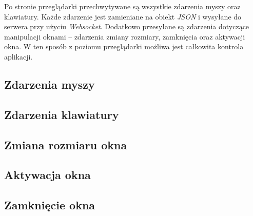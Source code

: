 Po stronie przeglądarki przechwytywane są wszystkie zdarzenia myszy oraz klawiatury. Każde zdarzenie jest zamieniane na obiekt \emph{JSON} i wysyłane do serwera przy użyciu \emph{Websocket}. Dodatkowo przesyłane są zdarzenia dotyczące manipulacji oknami -- zdarzenia zmiany rozmiary, zamknięcia oraz aktywacji okna. W ten sposób z poziomu przeglądarki możliwa jest całkowita kontrola aplikacji.

\subsection{Zdarzenia myszy}


\subsection{Zdarzenia klawiatury}


\subsection{Zmiana rozmiaru okna}


\subsection{Aktywacja okna}


\subsection{Zamknięcie okna}

